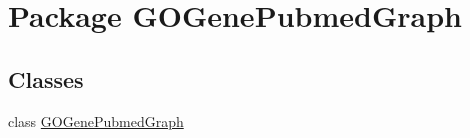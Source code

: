 \hypertarget{namespace_g_o_gene_pubmed_graph}{
\section{Package GOGenePubmedGraph}
\label{namespace_g_o_gene_pubmed_graph}
}
\subsection*{Classes}
\begin{DoxyCompactItemize}
\item 
class \hyperlink{class_g_o_gene_pubmed_graph_1_1_g_o_gene_pubmed_graph}{GOGenePubmedGraph}
\end{DoxyCompactItemize}
